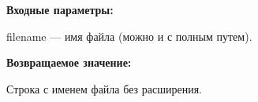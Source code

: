 \textbf{Входные параметры:}

filename --- имя файла (можно и с полным путем).

\textbf{Возвращаемое значение:}

Строка с именем файла без расширения.